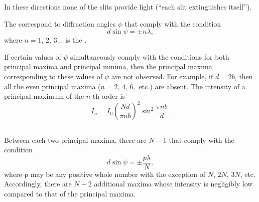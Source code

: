In these directions none of the slits provide light (``each slit extinguishes itself'').

The   correspond to diffraction angles $\psi$ that comply with the condition
\begin{equation*}%
d \sin \psi = \pm n \lambda,
\end{equation*}
where $n = 1,\,2, \, 3 \dots{}$ is the .

 If certain values of $\psi$ simultaneously comply with the conditions for both principal maxima and principal minima, then the principal maxima corresponding to these values of $\psi$ are not observed. For example, if $d = 2b$, then all the even principal maxima ($n = 2, \,4, \,6, $ etc.) are absent.
The intensity of a principal maximum of the $n$-th order is
\begin{equation*}%
I_{n} = I_{0} \left( \frac{Nd}{\pi n b} \right)^{2} \sin^{2} \frac{\pi n b}{d}.
\end{equation*}

\subsection{}\label{33.3.6} Between each two principal maxima, there are $N - 1$  that comply with the condition
\begin{equation*}%
d \sin \psi = \pm \frac{p \lambda}{N},
\end{equation*}
where p may be any positive whole number with the exception
of $N$, $2N$, $3N$, etc. Accordingly, there are $N-2$ additional maxima whose intensity is negligibly low compared to that of the principal maxima.

